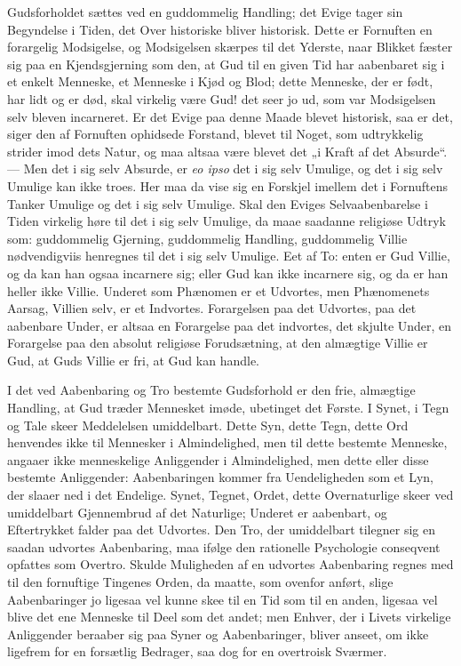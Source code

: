 \documentclass[12pt]{book}
\begin{document}
Gudsforholdet sættes ved en guddommelig Handling; det Evige tager
sin Begyndelse i Tiden, det Over\-
historiske bliver historisk. Dette er Fornuften en forargelig
Modsigelse, og Modsigelsen skærpes til det Yderste, naar Blikket
fæster sig paa en Kjendsgjerning som den, at Gud til en given Tid
har aabenbaret sig i et enkelt Menneske, et Menneske i Kjød og Blod;
dette Menneske, der er født, har lidt og er død, skal virkelig være
Gud! det seer jo ud, som var Modsigelsen selv bleven incarneret. Er
det Evige paa denne Maade blevet historisk, saa er det, siger den af
Fornuften ophidsede Forstand, blevet til Noget, som udtrykkelig
strider imod dets Natur, og maa altsaa være blevet det „i Kraft af
det Absurde“. --- Men det i sig selv Absurde, er \textit{eo ipso}
det i sig selv Umulige, og det i sig selv Umulige kan ikke troes.
Her maa da vise sig en Forskjel imellem det i Fornuftens Tanker
Umulige og det i sig selv Umulige. Skal den Eviges Selvaabenbarelse
i Tiden virkelig høre til det i sig selv Umulige, da maae saadanne
religiøse Udtryk som: guddommelig Gjerning, guddommelig Handling,
guddommelig Villie nødvendigviis henregnes til det i sig selv
Umulige. Eet af To: enten er Gud Villie, og da kan han ogsaa
incarnere sig; eller Gud kan ikke incarnere sig, og da er han heller
ikke Villie. Underet som Phænomen er et Udvortes, men Phænomenets
Aarsag, Villien selv, er et Indvortes. Forargelsen paa det Udvortes,
paa det aabenbare Under, er altsaa en Forargelse paa det indvortes,
det skjulte Under, en Forargelse paa den absolut religiøse
Forudsætning, at den almægtige Villie er Gud, at Guds Villie er fri,
at Gud kan handle.

I det ved Aabenbaring og Tro bestemte Gudsforhold er den frie,
almægtige Handling, at Gud træder Mennesket imøde, ubetinget det
Første. I Synet, i Tegn og Tale skeer Meddelelsen umiddelbart. Dette
Syn, dette Tegn, dette Ord henvendes ikke til Mennesker i
Almindelighed, men til dette bestemte Menneske, angaaer ikke
menneskelige Anliggender i Almindelighed, men dette
eller disse bestemte Anliggender: Aabenbaringen kommer fra
Uendeligheden som et Lyn, der slaaer ned i det Endelige. Synet,
Tegnet, Ordet, dette Overnaturlige skeer ved umiddelbart
Gjennembrud af det Naturlige; Underet er aabenbart, og Eftertrykket
falder paa det Udvortes. Den Tro, der umiddelbart tilegner sig en
saadan udvortes Aabenbaring, maa ifølge den rationelle Psychologie
conseqvent opfattes som Overtro. Skulde Muligheden af en udvortes
Aabenbaring regnes med til den fornuftige Tingenes Orden, da maatte,
som ovenfor anført, slige Aabenbaringer jo ligesaa vel kunne skee
til en Tid som til en anden, ligesaa vel blive det ene Menneske til
Deel som det andet; men Enhver, der i Livets virkelige Anliggender
beraaber sig paa Syner og Aabenbaringer, bliver anseet, om ikke
ligefrem for en forsætlig Bedrager, saa dog for en overtroisk
Sværmer.
\end{document}
